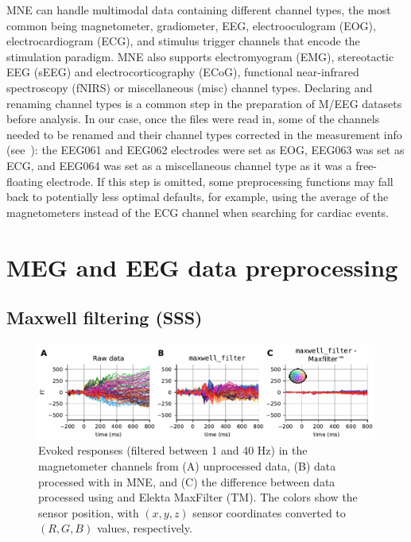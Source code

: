 MNE can handle multimodal data containing different channel types, the most common being magnetometer, gradiometer, EEG, electrooculogram (EOG), electrocardiogram (ECG), and stimulus trigger channels that encode the stimulation paradigm. MNE also supports electromyogram (EMG), stereotactic EEG (sEEG) and electrocorticography (ECoG), functional near-infrared spectroscopy (fNIRS) or miscellaneous (misc) channel types. Declaring and renaming channel types is a common step in the preparation of M/EEG datasets before analysis. In our case, once the files were read in, some of the channels needed to be renamed and their channel types corrected in the measurement info (see~\citep{wakeman2015multi}): the EEG061 and EEG062 electrodes were set as EOG, EEG063 was set as ECG, and EEG064 was set as a miscellaneous channel type as it was a free-floating electrode. If this step is omitted, some preprocessing functions may fall back to potentially less optimal defaults, for example, using the average of the magnetometers instead of the ECG channel when searching for cardiac events.

\section{MEG and EEG data preprocessing}

\subsection{Maxwell filtering (SSS)}
\label{sec:maxfilter}

\begin{figure}[htb]
        \centering
        \includegraphics{figures/Maxfilter.pdf}
        \caption{Evoked responses (filtered between 1 and 40 Hz) in the magnetometer channels from (A) unprocessed data, (B) data processed with  in MNE, and (C) the difference between data processed using  and Elekta MaxFilter (TM). The colors show the sensor position, with $(x, y, z)$ sensor coordinates converted to $(R, G, B)$ values, respectively.}
        \label{fig:fig_maxwell}
\end{figure}


